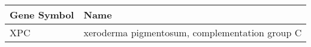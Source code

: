 \begin{tabular}{ll}
\toprule
Gene Symbol &                                           Name \\
\midrule
        XPC & xeroderma pigmentosum, complementation group C \\
\bottomrule
\end{tabular}
